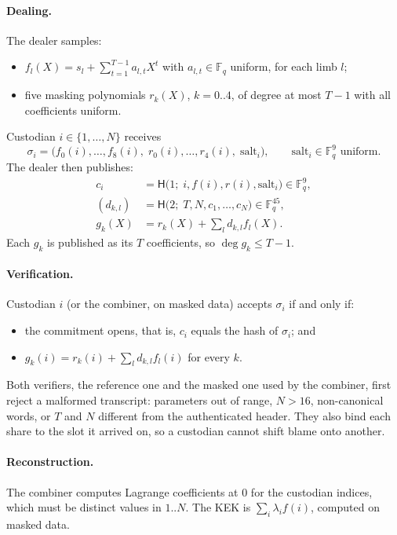 \documentclass[10pt,a4paper]{article}
\newcommand{\Fq}{\mathbb{F}_q}
\newcommand{\Hash}{\mathsf{H}}
\theoremstyle{definition}
\theoremstyle{remark}
\begin{document}
\paragraph{Dealing.} The dealer samples:
\begin{itemize}
  \item $f_l(X) = s_l + \sum_{t=1}^{T-1} a_{l,t} X^t$ with $a_{l,t}\in\Fq$ uniform, for each limb $l$;
  \item five masking polynomials $r_k(X)$, $k = 0..4$, of degree at most $T-1$ with all coefficients uniform.
\end{itemize}
Custodian $i \in \{1,\dots,N\}$ receives
\[
  \sigma_i = \bigl(f_0(i),\dots,f_8(i),\; r_0(i),\dots,r_4(i),\; \text{salt}_i\bigr),\qquad \text{salt}_i \in \Fq^9 \text{ uniform.}
\]
The dealer then publishes:
\begin{align*}
  c_i &= \Hash\bigl(1;\; i, f(i), r(i), \text{salt}_i\bigr) \in \Fq^9,\\
  (d_{k,l}) &= \Hash\bigl(2;\; T, N, c_1, \dots, c_N\bigr) \in \Fq^{45},\\
  g_k(X) &= r_k(X) + \textstyle\sum_{l} d_{k,l} f_l(X).
\end{align*}
Each $g_k$ is published as its $T$ coefficients, so $\deg g_k \le T-1$.

\paragraph{Verification.} Custodian $i$ (or the combiner, on masked data) accepts $\sigma_i$ if and only if:
\begin{itemize}
  \item the commitment opens, that is, $c_i$ equals the hash of $\sigma_i$; and
  \item $g_k(i) = r_k(i) + \sum_l d_{k,l} f_l(i)$ for every $k$.
\end{itemize}

Both verifiers, the reference one and the masked one used by the combiner, first reject a malformed transcript: parameters out of range, $N > 16$, non-canonical words, or $T$ and $N$ different from the authenticated header. They also bind each share to the slot it arrived on, so a custodian cannot shift blame onto another.

\paragraph{Reconstruction.} The combiner computes Lagrange coefficients at $0$ for the custodian indices, which must be distinct values in $1..N$. The KEK is $\sum_i \lambda_i f(i)$, computed on masked data.
\end{document}
